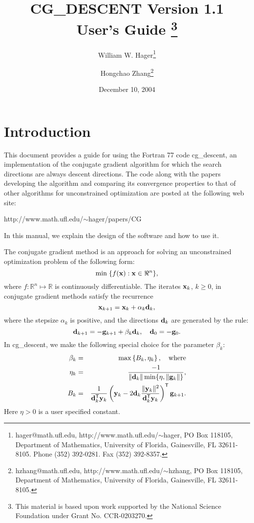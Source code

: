 \documentclass [12pt] {article}
\newcommand{\tr}{^{\sf T}}
\newcommand{\m}[1]{{\bf{#1}}}
\begin{document}
\medskip
\title{{\bf
CG\_DESCENT Version 1.1 \\
User's Guide
}\thanks{
This material is based upon work supported
by the National Science Foundation under Grant No. CCR-0203270.
}
}
\author{
        William W. Hager\thanks{hager@math.ufl.edu,
        http://www.math.ufl.edu/$\sim$hager,
        PO Box 118105,
        Department of Mathematics,
        University of Florida, Gainesville, FL 32611-8105.
        Phone (352) 392-0281. Fax (352) 392-8357.}
\and
Hongchao Zhang\thanks{
        hzhang@math.ufl.edu,
        http://www.math.ufl.edu/$\sim$hzhang,
        PO Box 118105,
        Department of Mathematics,
        University of Florida, Gainesville, FL 32611-8105.}
}
\date{December 10, 2004}

\maketitle

\newpage
\section{Introduction}
This document provides a guide for using the Fortran 77 code
{\sc cg\_descent},
an implementation of the conjugate gradient algorithm for which
the search directions are always descent directions.
The code along with the papers \cite{hz, hz2}
developing the algorithm and comparing its convergence
properties to that of other algorithms for unconstrained optimization
are posted at the following web site:
\begin{center}
http://www.math.ufl.edu/$\sim$hager/papers/CG
\end{center}
In this manual, we explain the design of the software and how to use it.

The conjugate gradient method is an approach for solving an unconstrained
optimization problem of the following form:
%
\[
\min \; \{ f (\m{x}) : \m{x} \in \Re^n \},
\]
%
where $f: \mathbb{R}^n \mapsto \mathbb{R}$ is continuously differentiable.
The iterates $\m{x}_k$, $k \ge 0$,
in conjugate gradient methods satisfy the recurrence
%
\[
\m{x}_{k+1} = \m{x}_k + \alpha_k \m{d}_k ,
\]
%
where the stepsize $\alpha_k$ is positive,
and the directions $\m{d}_k$ are generated by the rule:
%
\[
\m{d}_{k+1} = -\m{g}_{k+1} + \beta_k \m{d}_k, \quad \m{d}_0 = -\m{g}_0.
\]
%
In {\sc cg\_descent}, we make the following special choice for the
parameter $\beta_k$:
%
\begin{eqnarray*}
\beta_k &=& \max \left\{
B_k , \eta_k \right\}, \quad \mbox{where} \\
\eta_k &=&
\frac{-1}{\|\m{d}_k\| \min \{\eta, \|\m{g}_k \|\}} , \\
B_k &=&
\frac{1}{\m{d}_k\tr \m{y}_k}
\left( \m{y}_k - 2\m{d}_k\frac{\|\m{y}_k\|^2}
{\m{d}_k\tr\m{y}_k} \right)\tr\m{g}_{k+1} .
\end{eqnarray*}
%
Here $\eta > 0$ is a user specified constant.
\end{document}

